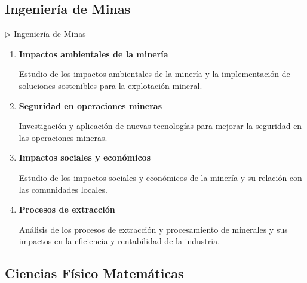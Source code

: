 \documentclass[12pt,a4paper]{article}
\begin{document}
\subsection{Ingeniería de Minas}

\begin{careerbox}{$\triangleright$ Ingeniería de Minas}
	\begin{enumerate}
		\item \textbf{Impactos ambientales de la minería}
		
		Estudio de los impactos ambientales de la minería y la implementación de soluciones sostenibles para la explotación mineral.
		
		\item \textbf{Seguridad en operaciones mineras}
		
		Investigación y aplicación de nuevas tecnologías para mejorar la seguridad en las operaciones mineras.
		
		\item \textbf{Impactos sociales y económicos}
		
		Estudio de los impactos sociales y económicos de la minería y su relación con las comunidades locales.
		
		\item \textbf{Procesos de extracción}
		
		Análisis de los procesos de extracción y procesamiento de minerales y sus impactos en la eficiencia y rentabilidad de la industria.
	\end{enumerate}
	
\end{careerbox}

\subsection{Ciencias Físico Matemáticas}
\end{document}
